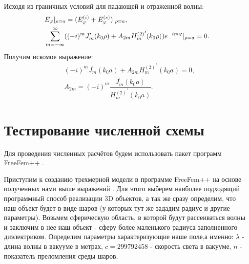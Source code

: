 Исходя из граничных условий для падающей и отраженной волны:
\begin{align}
&E_{\varphi}|_{\rho=a} = (E_{\varphi}^{(i)} + E_{\varphi}^{(s)})|_{\rho=a},\notag\\ &\sum_{m=-\infty}^{\infty}
((-i)^{m}J_{m}^{\prime}(k_{0}\rho) + A_{2m}{H_{m}^{(2)}}^{\prime}(k_{0}\rho))e^{-im\varphi}|_{\rho=a} = 0.
\end{align}
Получим искомое выражение:
\begin{align}
&(-i)^{m}J_{m}^{\prime}(k_{0}a) + A_{2m}{H_{m}^{(2)}}^{\prime}(k_{0}a) = 0,\\
&A_{2m} = (-i)^{m} \dfrac{J_{m}^{\prime}(k_{0}a)}
{{H_{m}^{(2)}}^{\prime}(k_{0}a)}.
\end{align}


\section{Тестирование численной схемы}
Для проведения численных расчётов будем использовать пакет программ FreeFem++ \cite{bfreefem}.

Приступим к созданию трехмерной модели в программе FreeFem++ на основе полученных нами выше выражений \cite{bfreefem}.  Для этого выберем наиболее подходящий программный способ реализации 3D объектов, а так же сразу определим, что наш объект будет в виде шаров (у которых тут же зададим радиус и другие параметры). Возьмем сферическую область, в которой будут рассеиваться волны и заключим в нее наш объект - сферу более маленького радиуса заполненного диэлектриком.
Определим параметры характеризующие наше поле,а именно:
	$ \lambda$ - длина волны в вакууме в метрах,
	$ c = 299792458 $ - скорость света в вакууме, $ n$ - показатель преломления среды шаров.

